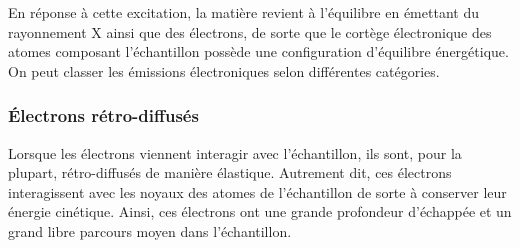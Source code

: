 \documentclass[a4paper,12pt]{article}
\begin{document}
En réponse à cette excitation, la matière revient à l'équilibre en émettant du rayonnement X ainsi que des électrons, 
de sorte que le cortège électronique des atomes composant l'échantillon possède une configuration d'équilibre énergétique. 
On peut classer les émissions électroniques selon différentes catégories.

\subsubsection*{Électrons rétro-diffusés}
Lorsque les électrons viennent interagir avec l'échantillon, ils sont, pour la plupart, rétro-diffusés de manière élastique.
Autrement dit, ces électrons interagissent avec les noyaux des atomes de l'échantillon de sorte à conserver leur énergie cinétique.
Ainsi, ces électrons ont une grande profondeur d'échappée et un grand libre parcours moyen dans l'échantillon.
\end{document}
